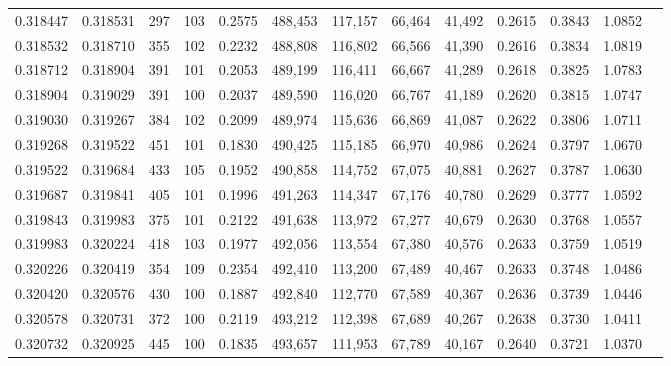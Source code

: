 \begin{tabular}{rrrrrrrrrrrrr}
0.318447 & 0.318531 &   297 & 103 &                                     0.2575 & 488,453 & 117,157 &  66,464 &  41,492 & 0.2615 & 0.3843 & 1.0852 \\
0.318532 & 0.318710 &   355 & 102 &                                     0.2232 & 488,808 & 116,802 &  66,566 &  41,390 & 0.2616 & 0.3834 & 1.0819 \\
0.318712 & 0.318904 &   391 & 101 &                                     0.2053 & 489,199 & 116,411 &  66,667 &  41,289 & 0.2618 & 0.3825 & 1.0783 \\
0.318904 & 0.319029 &   391 & 100 &                                     0.2037 & 489,590 & 116,020 &  66,767 &  41,189 & 0.2620 & 0.3815 & 1.0747 \\
0.319030 & 0.319267 &   384 & 102 &                                     0.2099 & 489,974 & 115,636 &  66,869 &  41,087 & 0.2622 & 0.3806 & 1.0711 \\
0.319268 & 0.319522 &   451 & 101 &                                     0.1830 & 490,425 & 115,185 &  66,970 &  40,986 & 0.2624 & 0.3797 & 1.0670 \\
0.319522 & 0.319684 &   433 & 105 &                                     0.1952 & 490,858 & 114,752 &  67,075 &  40,881 & 0.2627 & 0.3787 & 1.0630 \\
0.319687 & 0.319841 &   405 & 101 &                                     0.1996 & 491,263 & 114,347 &  67,176 &  40,780 & 0.2629 & 0.3777 & 1.0592 \\
0.319843 & 0.319983 &   375 & 101 &                                     0.2122 & 491,638 & 113,972 &  67,277 &  40,679 & 0.2630 & 0.3768 & 1.0557 \\
0.319983 & 0.320224 &   418 & 103 &                                     0.1977 & 492,056 & 113,554 &  67,380 &  40,576 & 0.2633 & 0.3759 & 1.0519 \\
0.320226 & 0.320419 &   354 & 109 &                                     0.2354 & 492,410 & 113,200 &  67,489 &  40,467 & 0.2633 & 0.3748 & 1.0486 \\
0.320420 & 0.320576 &   430 & 100 &                                     0.1887 & 492,840 & 112,770 &  67,589 &  40,367 & 0.2636 & 0.3739 & 1.0446 \\
0.320578 & 0.320731 &   372 & 100 &                                     0.2119 & 493,212 & 112,398 &  67,689 &  40,267 & 0.2638 & 0.3730 & 1.0411 \\
0.320732 & 0.320925 &   445 & 100 &                                     0.1835 & 493,657 & 111,953 &  67,789 &  40,167 & 0.2640 & 0.3721 & 1.0370 \\

\end{tabular}
